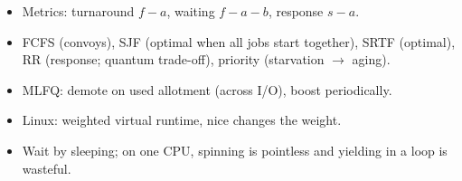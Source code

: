 \begin{keybox}
\begin{itemize}
  \item Metrics: turnaround $f-a$, waiting $f-a-b$, response $s-a$.
  \item FCFS (convoys), SJF (optimal when all jobs start together), SRTF (optimal),
    RR (response; quantum trade-off), priority (starvation $\to$ aging).
  \item MLFQ: demote on used allotment (across I/O), boost periodically.
  \item Linux: weighted virtual runtime, nice changes the weight.
  \item Wait by sleeping; on one CPU, spinning is pointless and yielding
    in a loop is wasteful.
\end{itemize}
\end{keybox}
